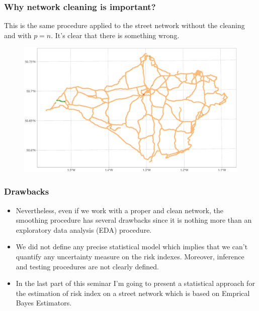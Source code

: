 \documentclass[c,10pt,pdftex]{beamer}
\begin{document}
\begin{frame}
\frametitle{Why network cleaning is important?}
\vspace{-0.25cm}
This is the same procedure applied to the street network without the cleaning and with $p = n$. It's clear that there is something wrong.
\begin{figure}
	\centering
	\includegraphics[width=\linewidth]{images/importance_of_network_cleaning}
\end{figure}
\end{frame}

\begin{frame}
\frametitle{Drawbacks}
\vspace{-0.75cm}
\begin{itemize}
	\setlength\itemsep{1em}
	\item Nevertheless, even if we work with a proper and clean network, the smoothing procedure has several drawbacks since it is nothing more than an exploratory data analysis (EDA) procedure. 
	
	\item We did not define any precise statistical model which implies that we can't quantify any uncertainty measure on the risk indexes. Moreover, inference and testing procedures are not clearly defined. 
	
	\item In the last part of this seminar I'm going to present a statistical approach for the estimation of risk index on a street network which is based on \alert{Emprical Bayes Estimators}. 	
\end{itemize}
\end{frame}
\end{document}
